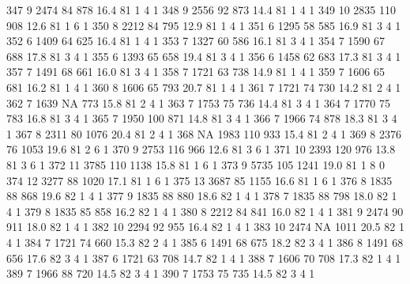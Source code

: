 \documentclass{article}
\begin{document}
\begin{Schunk}
\begin{Soutput}
347       9  2474  84  878 16.4  81      1       4        1
348       9  2556  92  873 14.4  81      1       4        1
349      10  2835 110  908 12.6  81      1       6        1
350       8  2212  84  795 12.9  81      1       4        1
351       6  1295  58  585 16.9  81      3       4        1
352       6  1409  64  625 16.4  81      1       4        1
353       7  1327  60  586 16.1  81      3       4        1
354       7  1590  67  688 17.8  81      3       4        1
355       6  1393  65  658 19.4  81      3       4        1
356       6  1458  62  683 17.3  81      3       4        1
357       7  1491  68  661 16.0  81      3       4        1
358       7  1721  63  738 14.9  81      1       4        1
359       7  1606  65  681 16.2  81      1       4        1
360       8  1606  65  793 20.7  81      1       4        1
361       7  1721  74  730 14.2  81      2       4        1
362       7  1639  NA  773 15.8  81      2       4        1
363       7  1753  75  736 14.4  81      3       4        1
364       7  1770  75  783 16.8  81      3       4        1
365       7  1950 100  871 14.8  81      3       4        1
366       7  1966  74  878 18.3  81      3       4        1
367       8  2311  80 1076 20.4  81      2       4        1
368      NA  1983 110  933 15.4  81      2       4        1
369       8  2376  76 1053 19.6  81      2       6        1
370       9  2753 116  966 12.6  81      3       6        1
371      10  2393 120  976 13.8  81      3       6        1
372      11  3785 110 1138 15.8  81      1       6        1
373       9  5735 105 1241 19.0  81      1       8        0
374      12  3277  88 1020 17.1  81      1       6        1
375      13  3687  85 1155 16.6  81      1       6        1
376       8  1835  88  868 19.6  82      1       4        1
377       9  1835  88  880 18.6  82      1       4        1
378       7  1835  88  798 18.0  82      1       4        1
379       8  1835  85  858 16.2  82      1       4        1
380       8  2212  84  841 16.0  82      1       4        1
381       9  2474  90  911 18.0  82      1       4        1
382      10  2294  92  955 16.4  82      1       4        1
383      10  2474  NA 1011 20.5  82      1       4        1
384       7  1721  74  660 15.3  82      2       4        1
385       6  1491  68  675 18.2  82      3       4        1
386       8  1491  68  656 17.6  82      3       4        1
387       6  1721  63  708 14.7  82      1       4        1
388       7  1606  70  708 17.3  82      1       4        1
389       7  1966  88  720 14.5  82      3       4        1
390       7  1753  75  735 14.5  82      3       4        1

\end{Soutput}
\end{Schunk}
\end{document}

